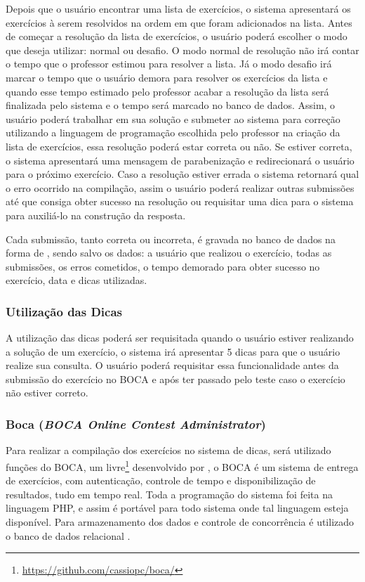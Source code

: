 Depois que o usuário encontrar uma lista de exercícios, o sistema apresentará os exercícios à serem resolvidos na ordem em que foram adicionados na lista. Antes de começar a resolução da lista de exercícios, o usuário poderá escolher o modo que deseja utilizar: normal ou desafio. O modo normal de resolução não irá contar o tempo que o professor estimou para resolver a lista. Já o modo desafio irá marcar o tempo que o usuário demora para resolver os exercícios da lista e quando esse tempo estimado pelo professor acabar a resolução da lista será finalizada pelo sistema e o tempo será marcado no banco de dados. Assim, o usuário poderá trabalhar em sua solução e submeter ao sistema para correção utilizando a linguagem de programação escolhida pelo professor na criação da lista de exercícios, essa resolução poderá estar correta ou não. Se estiver correta, o sistema apresentará uma mensagem de parabenização e redirecionará o usuário para o próximo exercício. Caso a resolução estiver errada o sistema retornará qual o erro ocorrido na compilação, assim o usuário poderá realizar outras submissões até que consiga obter sucesso na resolução ou requisitar uma dica para o sistema para auxiliá-lo na construção da resposta. 

Cada submissão, tanto correta ou incorreta, é gravada no banco de dados na forma de , sendo salvo os dados: a usuário que realizou o exercício, todas as submissões, os erros cometidos, o tempo demorado para obter sucesso no exercício, data e dicas utilizadas.

\subsubsection{Utilização das Dicas}

A utilização das dicas poderá ser requisitada quando o usuário estiver realizando a solução de um exercício, o sistema irá apresentar 5 dicas para que o usuário realize sua consulta. O usuário poderá requisitar essa funcionalidade antes da submissão do exercício no BOCA e após ter passado pelo teste caso o exercício não estiver correto.

\subsubsection{Boca (\textit{BOCA Online Contest Administrator})}

Para realizar a compilação dos exercícios no sistema de dicas, será utilizado funções do BOCA, um  livre\footnote{\url{https://github.com/cassiopc/boca/}} desenvolvido por , o BOCA é um sistema de entrega de exercícios, com autenticação, controle de tempo e disponibilização de resultados, tudo em tempo real. Toda a programação do sistema foi feita na linguagem PHP, e assim é portável para todo sistema onde tal linguagem esteja disponível. Para armazenamento dos dados e controle de concorrência é utilizado o banco de dados relacional . 

